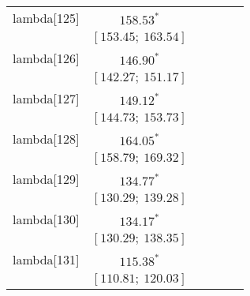 \begin{table}
\begin{center}
\begin{tabular}{l c c c c c }
lambda[125] & $158.53^{*}$                     &                           &                           &                         &                         \\
            & $[153.45;\ 163.54]$              &                           &                           &                         &                         \\
lambda[126] & $146.90^{*}$                     &                           &                           &                         &                         \\
            & $[142.27;\ 151.17]$              &                           &                           &                         &                         \\
lambda[127] & $149.12^{*}$                     &                           &                           &                         &                         \\
            & $[144.73;\ 153.73]$              &                           &                           &                         &                         \\
lambda[128] & $164.05^{*}$                     &                           &                           &                         &                         \\
            & $[158.79;\ 169.32]$              &                           &                           &                         &                         \\
lambda[129] & $134.77^{*}$                     &                           &                           &                         &                         \\
            & $[130.29;\ 139.28]$              &                           &                           &                         &                         \\
lambda[130] & $134.17^{*}$                     &                           &                           &                         &                         \\
            & $[130.29;\ 138.35]$              &                           &                           &                         &                         \\
lambda[131] & $115.38^{*}$                     &                           &                           &                         &                         \\
            & $[110.81;\ 120.03]$              &                           &                           &                         &                         \\

\end{tabular}
\end{center}
\end{table}
